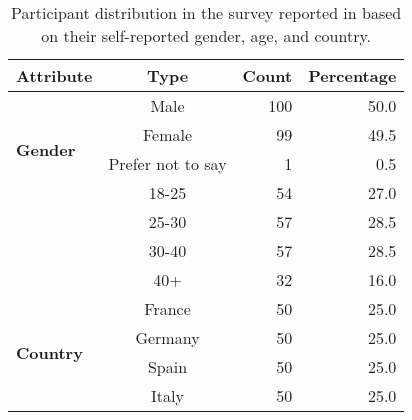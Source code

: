\begin{table}[t]
    \centering
   \small
   \begin{tabular}{@{}lcrr@{}}
\toprule
\textbf{Attribute}                & \textbf{Type}     & \multicolumn{1}{c}{\textbf{Count}} & \multicolumn{1}{c}{\textbf{Percentage}} \\ \midrule
\multirow{4}{*}{\textbf{Gender}}  & Male              &    100                             & 50.0                                     \\
                                  & Female            & 99                                & 49.5                                   \\
                                  & Prefer not to say & 1                                  & 0.5                                     \\ \midrule
\multirow{4}{*}{\textbf{Age}}     & 18-25             & 54                                 & 27.0                                    \\
                                  & 25-30             & 57                                & 28.5                                      \\
                                  & 30-40             & 57                                & 28.5                                    \\
                                  & 40+               & 32                                 & 16.0                                    \\ \midrule
\multirow{4}{*}{\textbf{Country}} & France            & 50                                & 25.0                                      \\
                                  & Germany           & 50                                & 25.0                                      \\
                                  & Spain             & 50                                & 25.0                                      \\
                                  & Italy             & 50                                & 25.0                                      \\ \bottomrule
\end{tabular}
    \caption{Participant distribution in the survey reported in  based on their self-reported gender, age, and country.}
    \label{Tab: Recommendation-Demographics}
\end{table}


